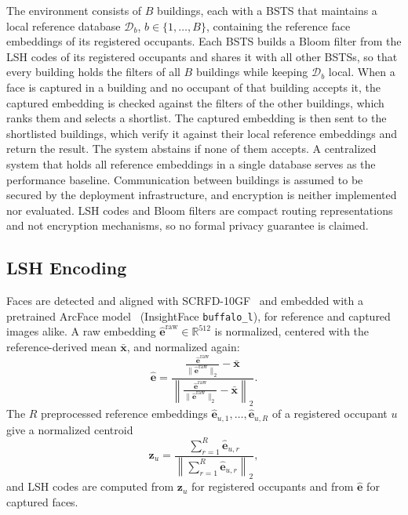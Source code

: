 \documentclass[pdflatex,sn-mathphys-num]{sn-jnl}%
\providecommand{\code}[1]{\texttt{#1}}%
\theoremstyle{thmstyleone}%
\theoremstyle{thmstyletwo}%
\theoremstyle{thmstylethree}%
\begin{document}
The environment consists of $B$ buildings, each with a BSTS that maintains a local reference database $\mathcal{D}_b$, $b\in\{1,\ldots,B\}$, containing the reference face embeddings of its registered occupants. Each BSTS builds a Bloom filter from the LSH codes of its registered occupants and shares it with all other BSTSs, so that every building holds the filters of all $B$ buildings while keeping $\mathcal{D}_b$ local. When a face is captured in a building and no occupant of that building accepts it, the captured embedding is checked against the filters of the other buildings, which ranks them and selects a shortlist. The captured embedding is then sent to the shortlisted buildings, which verify it against their local reference embeddings and return the result. The system abstains if none of them accepts. A centralized system that holds all reference embeddings in a single database serves as the performance baseline. Communication between buildings is assumed to be secured by the deployment infrastructure, and encryption is neither implemented nor evaluated. LSH codes and Bloom filters are compact routing representations and not encryption mechanisms, so no formal privacy guarantee is claimed.

\subsection{LSH Encoding}
\label{subsec:lsh_encoding}

Faces are detected and aligned with SCRFD-10GF~\cite{guo2022} and embedded with a pretrained ArcFace model~\cite{deng2019} (InsightFace \code{buffalo\_l}), for reference and captured images alike. A raw embedding $\hat{\mathbf{e}}^{\mathrm{raw}}\in\mathbb{R}^{512}$ is normalized, centered with the reference-derived mean $\bar{\mathbf{x}}$, and normalized again:
\begin{equation}
    \hat{\mathbf{e}}
    =
    \frac{
        \frac{\hat{\mathbf{e}}^{\mathrm{raw}}}{\|\hat{\mathbf{e}}^{\mathrm{raw}}\|_2}
        - \bar{\mathbf{x}}
    }{
        \left\|
        \frac{\hat{\mathbf{e}}^{\mathrm{raw}}}{\|\hat{\mathbf{e}}^{\mathrm{raw}}\|_2}
        - \bar{\mathbf{x}}
        \right\|_2
    }.
    \label{eq:embedding_preprocessing}
\end{equation}
The $R$ preprocessed reference embeddings $\hat{\mathbf{e}}_{u,1},\ldots,\hat{\mathbf{e}}_{u,R}$ of a registered occupant $u$ give a normalized centroid
\begin{equation}
    \mathbf{z}_u
    =
    \frac{
        \sum_{r=1}^{R}\hat{\mathbf{e}}_{u,r}
    }{
        \left\|\sum_{r=1}^{R}\hat{\mathbf{e}}_{u,r}\right\|_2
    },
    \label{eq:identity_centroid}
\end{equation}
and LSH codes are computed from $\mathbf{z}_u$ for registered occupants and from $\hat{\mathbf{e}}$ for captured faces.
\end{document}
